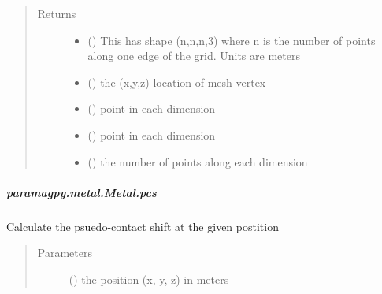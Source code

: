 \documentclass[a4paper,10pt,english,openany,oneside]{sphinxmanual}
\begin{document}
\begin{fulllineitems}
\begin{fulllineitems}
\begin{fulllineitems}
\begin{quote}
\begin{description}
\begin{itemize}
\end{itemize}

\item[{Returns}] \leavevmode
\begin{itemize}
\item {} 
 () \textendash{} This has shape (n,n,n,3) where n is the number of points
along one edge of the grid. Units are meters

\item {} 
 () \textendash{} the (x,y,z) location of mesh vertex

\item {} 
 () \textendash{} point in each dimension

\item {} 
 () \textendash{} point in each dimension

\item {} 
 () \textendash{} the number of points along each dimension

\end{itemize}


\end{description}\end{quote}

\end{fulllineitems}



\subparagraph{paramagpy.metal.Metal.pcs}
\label{\detokenize{reference/generated/paramagpy.metal.Metal.pcs:paramagpy-metal-metal-pcs}}\label{\detokenize{reference/generated/paramagpy.metal.Metal.pcs::doc}}

\begin{fulllineitems}
\label{\detokenize{reference/generated/paramagpy.metal.Metal.pcs:paramagpy.metal.Metal.pcs}}
Calculate the psuedo-contact shift at the given postition
\begin{quote}\begin{description}
\item[{Parameters}] \leavevmode
{} () \textendash{} the position (x, y, z) in meters


\end{description}
\end{quote}
\end{fulllineitems}
\end{fulllineitems}
\end{fulllineitems}
\end{document}
